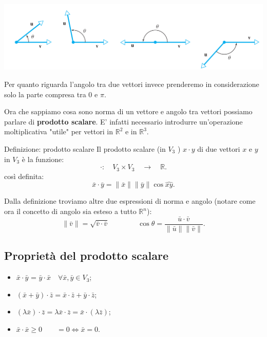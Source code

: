 \documentclass[x11names]{article}
\begin{document}
\begin{center}
\includegraphics[scale=0.25]{figures/angoli.png}
\end{center}
Per quanto riguarda l'angolo tra due vettori invece prenderemo in considerazione solo la parte compresa tra $0$ e $\pi$.


Ora che sappiamo cosa sono norma di un vettore e angolo tra vettori possiamo parlare di \textbf{prodotto scalare}. E' infatti necessario introdurre un'operazione moltiplicativa "utile" per vettori in $\mathbb{R}^2$ e in $\mathbb{R}^3$.

\begin{center}
\colorbox{myblue}{\begin{minipage}{5.75in}
\begin{blues}{Definizione: prodotto scalare}
Il prodotto scalare (in $V_3$ ) $x\cdot y$ di due vettori $x$ e $y$ in $V_3$ è la funzione:
\[
\cdot : \quad V_3 \times V_3 \quad \longrightarrow \quad \mathbb{R}
.\] 
così definita:
\[
\bar{x }\cdot \bar{y}  = \|\bar{x}\| \|\bar{y}\| \cos{\hat{xy}}
.\] 

\end{blues}
\end{minipage}}        
\end{center}

Dalla definizione troviamo altre due espressioni di norma e angolo (notare come ora il concetto di angolo sia esteso a tutto $\mathbb{R}^n$):
\[
\|\bar{v}\| = \sqrt{\bar{v}\cdot \bar{v}} \qquad \qquad \cos{\theta} = \frac{\bar{u}\cdot \bar{v}}{\|\bar{u}\|\|\bar{v}\|}
.\]

\subsection{Proprietà del prodotto scalare}
\begin{itemize}
	\item $\bar{x} \cdot \bar{y}$ = $\bar{y} \cdot \bar{x} \quad \forall \bar{x},\bar{y} \in V_3$;
	\item $\left(\bar{x} + \bar{y}\right)\cdot \bar{z} = \bar{x}\cdot \bar{z} + \bar{y}\cdot \bar{z}$;
	\item $\left(\lambda \bar{x}\right)\cdot \bar{z} = \lambda \bar{x} \cdot \bar{z }= \bar{x }\cdot \left(\lambda \bar{z}\right)$;
	\item $\bar{x}\cdot \bar{x} \geq 0 \qquad = 0 \Longleftrightarrow \bar{x} = 0$.
\end{itemize}
\end{document}

